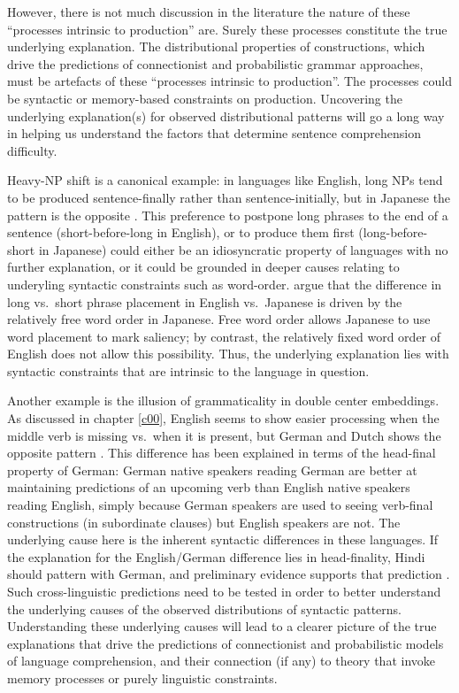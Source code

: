 \documentclass{cambridge7A}\usepackage[]{graphicx}\usepackage[]{color}
\begin{document}
However, there is not much discussion in the literature the nature of these ``processes intrinsic to production'' are. Surely these processes constitute the true underlying explanation. The distributional properties of constructions, which drive the predictions of connectionist and probabilistic grammar approaches, must be artefacts of these ``processes intrinsic to production''.  The processes could be syntactic or memory-based constraints on production. Uncovering the underlying explanation(s) for observed distributional patterns will go a long  way in helping us understand the factors that determine sentence  comprehension  difficulty.

Heavy-NP shift is a canonical example: in languages like  English, long NPs tend to be produced sentence-finally rather  than sentence-initially, but in  Japanese the pattern is the opposite \citep{yamashita2001long}. This preference to postpone long phrases to the end of a sentence (short-before-long in English), or to produce them first (long-before-short in Japanese) could either be an idiosyncratic property of languages with no further explanation, or it could be grounded in deeper causes relating to underyling syntactic constraints such as word-order.  \citep[B54][]{yamashita2001long} argue that the difference in long vs.\ short phrase placement in English vs.\ Japanese is driven by the relatively free word order in Japanese. Free word order allows Japanese to use word placement to mark saliency; by contrast, the relatively fixed word order of English does not allow this possibility.
Thus, the underlying explanation lies with syntactic constraints that are intrinsic to the language in question.

Another example is the illusion of grammaticality in  double center embeddings. As discussed in chapter \ref{c00}, English seems to show easier processing when the middle verb is missing vs.\ when it is present, but German and Dutch shows the opposite pattern \citep{VasishthSuckowLewis2010,FrankTrompenaarsVasishth2015}. This difference has been explained in terms of the head-final property of German: German native speakers reading German are better at maintaining predictions of an upcoming verb than English native speakers reading English, simply because German speakers are used to seeing verb-final constructions (in subordinate clauses) but English speakers are not. The underlying cause here is the inherent syntactic differences in these languages. If the explanation for the English/German difference lies in head-finality,  Hindi should pattern with German, and preliminary evidence supports that prediction \citep{HusainBhatia2018}. Such cross-linguistic predictions need to be tested in order to better understand the underlying causes of the observed distributions of syntactic patterns. Understanding these  underlying causes will lead to a clearer picture of the true explanations that drive the predictions of connectionist and probabilistic models of language comprehension, and their connection (if any) to theory that invoke memory processes or purely linguistic constraints.
\end{document}
